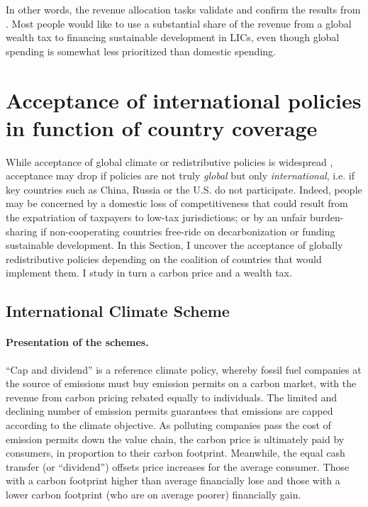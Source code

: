 \documentclass[12pt,english]{article}
\begin{document}
\begin{bibunit}
In other words, the revenue allocation tasks validate and confirm the results from \citep{fabre_majority_2025}. Most people would like to use a substantial share of the revenue from a global wealth tax to financing sustainable development in LICs, even though global spending is somewhat less prioritized than domestic spending. 


\section{Acceptance of international policies in function of country coverage\label{sec:coverage}}

While acceptance of global climate or redistributive policies is widespread \citep{fabre_majority_2025,cappelen_majority_2025}, acceptance may drop if policies are not truly \textit{global} but only \textit{international}, i.e. if key countries such as China, Russia or the U.S. do not participate. Indeed, people may be concerned by a domestic loss of competitiveness that could result from the expatriation of taxpayers to low-tax jurisdictions; or by an unfair burden-sharing if non-cooperating countries free-ride on decarbonization or funding sustainable development. %
In this Section, I uncover the acceptance of globally redistributive policies depending on the coalition of countries that would implement them. I study in turn a carbon price and a wealth tax.

\subsection{International Climate Scheme}\label{subsec:ics}


\paragraph{Presentation of the schemes.} ``Cap and dividend'' is a reference climate policy, %
whereby fossil fuel companies at the source of emissions must buy emission permits on a carbon market, with the revenue from carbon pricing rebated equally to individuals. The limited and declining number of emission permits guarantees that emissions are capped according to the climate objective. As polluting companies pass the cost of emission permits down the value chain, the carbon price is ultimately paid by consumers, in proportion to their carbon footprint. Meanwhile, the equal cash transfer (or ``dividend'') offsets price increases for the average consumer. Those with a carbon footprint higher than average financially lose and those with a lower carbon footprint (who are on average poorer) financially gain. 


\end{bibunit}
\end{document}
